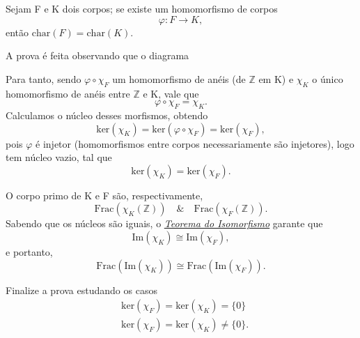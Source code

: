 \documentclass[../algebraIII_notes.tex]{subfiles}
\begin{document}
\begin{prop*}
	Sejam F e K dois corpos; se existe um homomorfismo de corpos
	\[
		\varphi :F\rightarrow K,
	\]
	então \(\mathrm{char}(F)=\mathrm{char}(K).\)
\end{prop*}
\begin{proof*}
	A prova é feita observando que o diagrama
	\begin{center}
	\end{center}
	Para tanto, sendo \(\varphi \circ \chi_{F}\) um homomorfismo de anéis (de \(\mathbb{Z}\) em K) e \(\chi_{K}\) o único homomorfismo de anéis entre \(\mathbb{Z}\) e K, vale que
	\[
		\varphi \circ \chi_{F}=\chi_{K}.
	\]
	Calculamos o núcleo desses morfismos, obtendo
	\[
		\mathrm{ker}(\chi_{K})=\mathrm{ker}(\varphi \circ \chi_{F})=\mathrm{ker}(\chi_{F}),
	\]
	pois \(\varphi \) é injetor (homomorfismos entre corpos necessariamente são injetores), logo tem núcleo vazio, tal que
	\[
		\mathrm{ker}(\chi_{K}) = \mathrm{ker}(\chi_{F}).
	\]

	O corpo primo de K e F são, respectivamente,
	\[
		\mathrm{Frac}(\chi_{K}(\mathbb{Z})) \quad\&\quad \mathrm{Frac}(\chi_{F}(\mathbb{Z})).
	\]
	Sabendo que os núcleos são iguais, o \hyperlink{isomorphism_theorem}{\textit{Teorema do Isomorfismo}} garante que
	\[
		\mathrm{Im}(\chi_{K})\cong \mathrm{Im}(\chi_{F}),
	\]
	e portanto,
	\[
		\mathrm{Frac}(\mathrm{Im}(\chi_{K}))\cong \mathrm{Frac}(\mathrm{Im}(\chi_{F})).
	\]
\end{proof*}
\begin{exr}
	Finalize a prova estudando os casos
	\begin{align*}
		 & \mathrm{ker}(\chi_{F})=\mathrm{ker}(\chi_{K})=\{0\}      \\
		 & \mathrm{ker}(\chi_{F})=\mathrm{ker}(\chi_{K})\neq \{0\}.
	\end{align*}
\end{exr}
\end{document}
